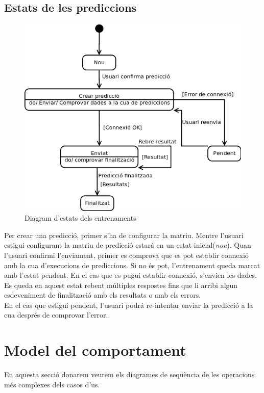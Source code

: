 \subsection{Estats de les prediccions}
\begin{figure}[H]
  \centering
  \includegraphics[scale=0.4]{img/specification/StatesPrediction.png}
  \caption{Diagram d'estats dels entrenaments}
  \label{fig:statestraining}
\end{figure}
Per crear una predicci\'{o}, primer s'ha de configurar la matriu. Mentre l'usuari estigui configurant la matriu de predicci\'{o} estar\'{a} en un estat inicial(\textit{nou}). Quan l'usuari confirmi l'enviament, primer es comprova que es pot establir connexi\'{o} amb la cua d'execucions de prediccions. Si no \'{e}s pot, l'entrenament queda marcat amb l'estat pendent. En el cas que es pugui establir connexi\'{o}, s'envien les dades. Es queda en aquest estat rebent múltiples respostes fins que li arribi algun esdeveniment de finalitzaci\'{o} amb els resultats o amb els errors.\\
En el cas que estigui pendent, l'usuari podr\'{a} re-intentar enviar la predicci\'{o} a la cua despr\'{e}s de comprovar l'error.

\section{Model del comportament}
En aquesta secci\'{o} donarem veurem els diagrames de seqüència de les operacions m\'{e}s complexes dels casos d'us.
